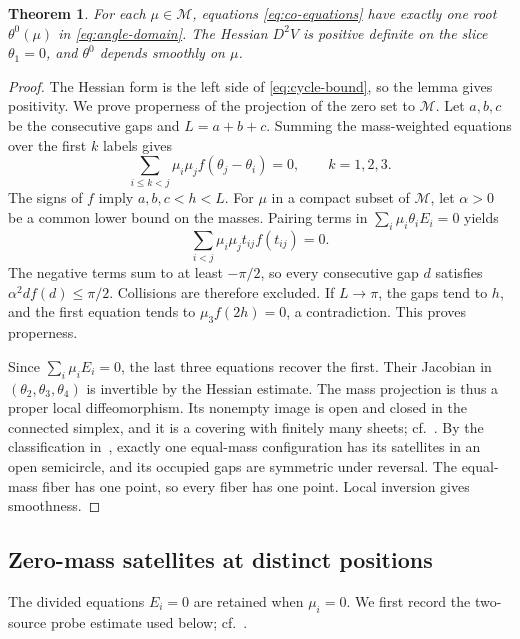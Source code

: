 \documentclass[11pt,a4paper]{article}
\numberwithin{equation}{section}
\newtheorem{theorem}{Theorem}[section]
\theoremstyle{remark}
\newcommand{\M}{\mathcal M}
\begin{document}
\begin{theorem}\label{thm:coorbital}
For each $\mu\in\M$, equations \eqref{eq:co-equations} have exactly one root $\theta^0(\mu)$ in \eqref{eq:angle-domain}. The Hessian $D^2V$ is positive definite on the slice $\theta_1=0$, and $\theta^0$ depends smoothly on $\mu$.
\end{theorem}
\begin{proof}
The Hessian form is the left side of \eqref{eq:cycle-bound}, so the lemma gives positivity. We prove properness of the projection of the zero set to $\M$. Let $a,b,c$ be the consecutive gaps and $L=a+b+c$. Summing the mass-weighted equations over the first $k$ labels gives
\begin{equation}\label{eq:co-cut}
 \sum_{i\le k<j}\mu_i\mu_jf(\theta_j-\theta_i)=0,\qquad k=1,2,3.
\end{equation}
The signs of $f$ imply $a,b,c<h<L$. For $\mu$ in a compact subset of $\M$, let $\alpha>0$ be a common lower bound on the masses. Pairing terms in $\sum_i\mu_i\theta_iE_i=0$ yields
\[
 \sum_{i<j}\mu_i\mu_jt_{ij}f(t_{ij})=0.
\]
The negative terms sum to at least $-\pi/2$, so every consecutive gap $d$ satisfies $\alpha^2df(d)\le\pi/2$. Collisions are therefore excluded. If $L\to\pi$, the gaps tend to $h$, and the first equation tends to $\mu_3f(2h)=0$, a contradiction. This proves properness.

Since $\sum_i\mu_iE_i=0$, the last three equations recover the first.
Their Jacobian in $(\theta_2,\theta_3,\theta_4)$ is invertible by the Hessian estimate. The mass projection is thus a proper local diffeomorphism. Its nonempty image is open and closed in the connected simplex, and it is a covering with finitely many sheets; cf.~\cite[proof of Proposition~3]{CCLM}. By the classification in~\cite[main theorem]{AF}, exactly one equal-mass configuration has its satellites in an open semicircle, and its occupied gaps are symmetric under reversal. The equal-mass fiber has one point, so every fiber has one point. Local inversion gives smoothness.
\end{proof}

\subsection{Zero-mass satellites at distinct positions}

The divided equations $E_i=0$ are retained when $\mu_i=0$.
We first record the two-source probe estimate used below; cf.~\cite[Lemma~2]{DHW}.
\end{document}
